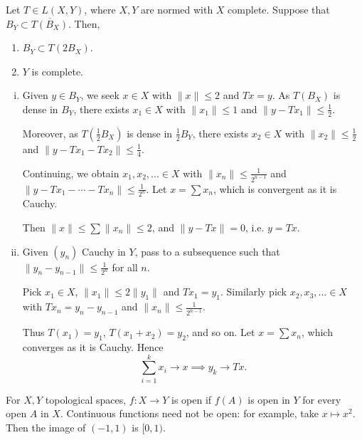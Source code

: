\documentclass[12pt]{article}
\begin{document}
\begin{theorem}
	Let $T \in L(X, Y)$, where $X, Y$ are normed with $X$ complete. Suppose that $B_Y \subset \overline{T(B_X)}$. Then,
	\begin{enumerate}[\normalfont(i)]
		\item $B_Y \subset T(2B_X)$.
		\item $Y$ is complete.
	\end{enumerate}	
\end{theorem}

\begin{proofbox}
	\begin{enumerate}[(i)]
		\item Given $y \in B_Y$, we seek $x \in X$ with $\|x\| \leq 2$ and $Tx = y$. As $T(B_X)$ is dense in $B_Y$, there exists $x_1 \in X$ with $\|x_1\| \leq 1$ and $\|y - Tx_1\| \leq \frac{1}{2}$.

			Moreover, as $T(\frac{1}{2} B_X)$ is dense in $\frac{1}{2} B_Y$, there exists $x_2 \in X$ with $\|x_2\| \leq \frac{1}{2}$ and $\|y - Tx_1 - Tx_2\| \leq \frac{1}{4}$.

			Continuing, we obtain $x_1, x_2, \ldots \in X$ with $\|x_n\| \leq \frac{1}{2^{n-1}}$ and $\|y - Tx_1 - \cdots - Tx_n\| \leq \frac{1}{2^{n}}$. Let $x = \sum x_n$, which is convergent as it is Cauchy.

			Then $\|x\| \leq \sum \|x_n\| \leq 2$, and $\|y - Tx\| = 0$, i.e. $y = Tx$.
		\item Given $(y_n)$ Cauchy in $Y$, pass to a subsequence such that $\|y_n - y_{n-1}\| \leq \frac{1}{2^{n}}$ for all $n$.

			Pick $x_1 \in X$, $\|x_1\| \leq 2\|y_1\|$ and $Tx_1 = y_1$. Similarly pick $x_2, x_3, \ldots \in X$ with $Tx_n = y_n - y_{n-1}$ and $\|x_n\| \leq \frac{1}{2^{n-1}}$.

			Thus $T(x_1) = y_1$, $T(x_1 + x_2) = y_2$, and so on. Let $x = \sum x_n$, which converges as it is Cauchy. Hence
			\[
			\sum_{i = 1}^{k} x_i \to x \implies y_k \to Tx.
			\]
	\end{enumerate}
	
\end{proofbox}


For $X, Y$ topological spaces, $f : X \to Y$ is open if $f(A)$ is open in $Y$ for every open $A$ in $X$. Continuous functions need not be open: for example, take $x \mapsto x^2$. Then the image of $(-1, 1)$ is $[0, 1)$.
\end{document}
